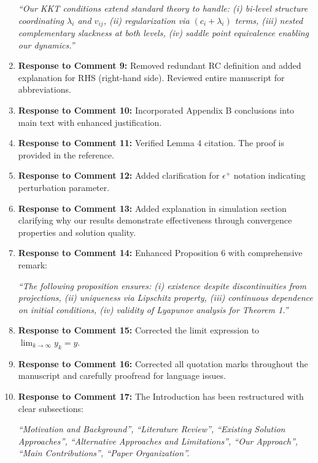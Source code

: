 \documentclass[journal,twoside,web]{ieeecolor}
\begin{document}
\begin{enumerate}
{\color{revisionblue}\textit{``Our KKT conditions extend standard theory to handle: (i) bi-level structure coordinating $\lambda_i$ and $v_{ij}$, (ii) regularization via $(c_i + \lambda_i)$ terms, (iii) nested complementary slackness at both levels, (iv) saddle point equivalence enabling our dynamics.''}}

\item \textbf{Response to Comment 9:} Removed redundant RC definition and added explanation for RHS (right-hand side). Reviewed entire manuscript for abbreviations.

\item \textbf{Response to Comment 10:} Incorporated Appendix B conclusions into main text with enhanced justification.

\item \textbf{Response to Comment 11:} Verified Lemma 4 citation. The proof is provided in the reference.

\item \textbf{Response to Comment 12:} Added clarification for $\epsilon^+$ notation indicating perturbation parameter.

\item \textbf{Response to Comment 13:} Added explanation in simulation section clarifying why our results demonstrate effectiveness through convergence properties and solution quality.

\item \textbf{Response to Comment 14:} Enhanced Proposition 6 with comprehensive remark:

{\color{revisionblue}\textit{``The following proposition ensures: (i) existence despite discontinuities from projections, (ii) uniqueness via Lipschitz property, (iii) continuous dependence on initial conditions, (iv) validity of Lyapunov analysis for Theorem 1.''}}

\item \textbf{Response to Comment 15:} Corrected the limit expression to $\lim_{k \to \infty} y_k=y$.

\item \textbf{Response to Comment 16:} Corrected all quotation marks throughout the manuscript and carefully proofread for language issues.

\item \textbf{Response to Comment 17:} The Introduction has been restructured with clear subsections:

{\color{revisionblue}\textit{``Motivation and Background'', ``Literature Review'', ``Existing Solution Approaches'', ``Alternative Approaches and Limitations'', ``Our Approach'', ``Main Contributions'', ``Paper Organization''.}}


\end{enumerate}
\end{document}
